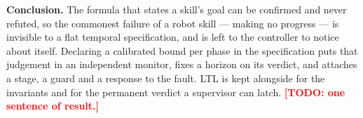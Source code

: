 \documentclass[letterpaper, 10pt, journal, twoside]{IEEEtran}
\newcommand{\TODO}[1]{\textcolor{red}{\textbf{[TODO: #1]}}}
\begin{document}
\textbf{Conclusion.} The formula that states a skill's goal can be
confirmed and never refuted, so the commonest failure of a robot skill
--- making no progress --- is invisible to a flat temporal
specification, and is left to the controller to notice about itself.
Declaring a calibrated bound per phase in the specification puts that
judgement in an independent monitor, fixes a horizon on its verdict, and
attaches a stage, a guard and a response to the fault. LTL is kept
alongside for the invariants and for the permanent verdict a supervisor
can latch. \TODO{one sentence of result.}



\end{document}
